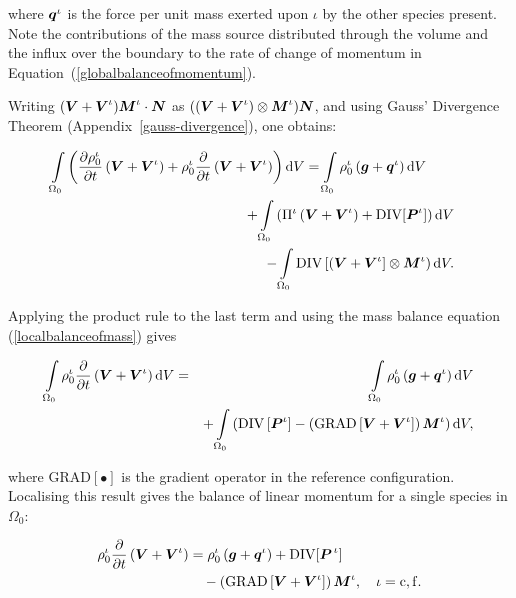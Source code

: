 \noindent where $\mbox{\boldmath$ q$}^\iota$ is the force per unit mass exerted upon
$\iota$ by the other species present. Note the contributions of the
mass source distributed through the volume and the influx over the
boundary to the rate of change of momentum in
Equation~(\ref{globalbalanceofmomentum}).

Writing $(\mbox{\boldmath$ V$}+\mbox{\boldmath$ V$}^\iota) \mbox{\boldmath$ M$}^\iota\cdot\mbox{\boldmath$ N$}$ as
$((\mbox{\boldmath$ V$}+\mbox{\boldmath$ V$}^\iota)\otimes\mbox{\boldmath$ M$}^\iota)\mbox{\boldmath$ N$}$, and using Gauss' Divergence
Theorem (Appendix~\ref{gauss-divergence}), one obtains:

\begin{eqnarray}
\int\limits_{\Omega_0} \left(\frac{\partial\rho_0^\iota}{\partial
  t}\left(\mbox{\boldmath$ V$}+\mbox{\boldmath$ V$}^\iota\right) + \rho_0^\iota\frac{\partial}{\partial
  t}\left(\mbox{\boldmath$ V$}+\mbox{\boldmath$ V$}^\iota\right)\right) \mathrm{d}V =
\int\limits_{\Omega_0}\rho^\iota_0\left(\mbox{\boldmath$ g$}+\mbox{\boldmath$ q$}^\iota\right)
\mathrm{d}V \qquad&
&\nonumber\\ +\int\limits_{\Omega_0}\left(\Pi^\iota\left(\mbox{\boldmath$ V$}+\mbox{\boldmath$ V$}^\iota\right)
+ \mathrm{DIV}[\mbox{\boldmath$ P$}^\iota]\right) \mathrm{d}V& & \nonumber\\ -
\int\limits_{\Omega_0}\mathrm{DIV}
\left[\left(\mbox{\boldmath$ V$}+\mbox{\boldmath$ V$}^\iota\right]\otimes\mbox{\boldmath$ M$}^\iota\right)\mathrm{d}V .
\nonumber & &
\end{eqnarray}

\noindent Applying the product rule to the last term and using the
mass balance equation (\ref{localbalanceofmass}) gives

\begin{eqnarray}
\int\limits_{\Omega_0} \rho_0^\iota\frac{\partial}{\partial
  t}\left(\mbox{\boldmath$ V$}+\mbox{\boldmath$ V$}^\iota\right) \mathrm{d}V &=&
\int\limits_{\Omega_0}\rho^\iota_0\left(\mbox{\boldmath$ g$}+\mbox{\boldmath$ q$}^\iota\right)
\mathrm{d}V \nonumber\\ & &+
\int\limits_{\Omega_0}\left(\mathrm{DIV}\left[\mbox{\boldmath$ P$}^\iota\right] -
\left(\mathrm{GRAD}\left[\mbox{\boldmath$ V$}+\mbox{\boldmath$ V$}^\iota\right]\right)\mbox{\boldmath$ M$}^\iota\right)
\mathrm{d}V, \nonumber
\end{eqnarray}

\noindent where $\mathrm{{GRAD}[\bullet]}$ is the gradient operator in
the reference configuration. Localising this result gives the balance
of linear momentum for a single species in $\Omega_{0}$:

\begin{equation}
\begin{split}
\rho_0^\iota\frac{\partial}{\partial t}\left(\mbox{\boldmath$ V$}+\mbox{\boldmath$ V$}^\iota\right) &
=\rho^\iota_0\left(\mbox{\boldmath$ g$}+\mbox{\boldmath$ q$}^\iota\right) +
\mathrm{DIV}[\mbox{\boldmath$ P$}^{\,\iota}]\\ & \quad -\left(\mathrm{GRAD}\left[\mbox{\boldmath$ V$}+
  \mbox{\boldmath$ V$}^\iota\right]\right)\mbox{\boldmath$ M$}^\iota, \quad \iota = \mathrm{c,f}.
\label{localbalanceofmomentum}
\end{split}
\end{equation} 


